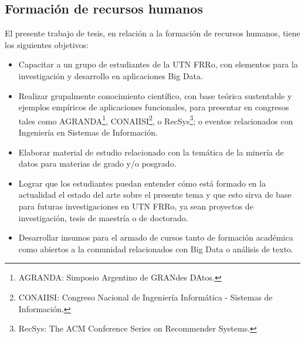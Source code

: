 \subsection{Formación de recursos humanos}
El presente trabajo de tesis, en relación a la formación de recursos humanos, tiene los siguientes objetivos:
\begin{itemize}
	\item Capacitar a un grupo de estudiantes de la UTN FRRo, con elementos para la investigación y desarrollo en aplicaciones Big Data.
	\item Realizar grupalmente conocimiento científico, con base teórica sustentable y ejemplos empíricos de aplicaciones funcionales, para presentar en congresos tales como AGRANDA\footnote{AGRANDA: Simposio Argentino de GRANdes DAtos.}, CONAIISI\footnote{CONAIISI: Congreso Nacional de Ingeniería Informática - Sistemas de Información.}, o RecSys\footnote{RecSys: The ACM Conference Series on Recommender Systems.}; o eventos relacionados con Ingeniería en Sistemas de Información.
	\item Elaborar material de estudio relacionado con la temática de la minería de datos para materias de grado y/o posgrado.
	\item Lograr que los estudiantes puedan entender cómo está formado en la actualidad el estado del arte sobre el presente tema y que esto sirva de base para futuras investigaciones en UTN FRRo, ya sean proyectos de investigación, tesis de maestría o de doctorado.
	\item Desarrollar insumos para el armado de cursos tanto de formación académica como abiertos a la comunidad relacionados con Big Data o análisis de texto.
\end{itemize}

